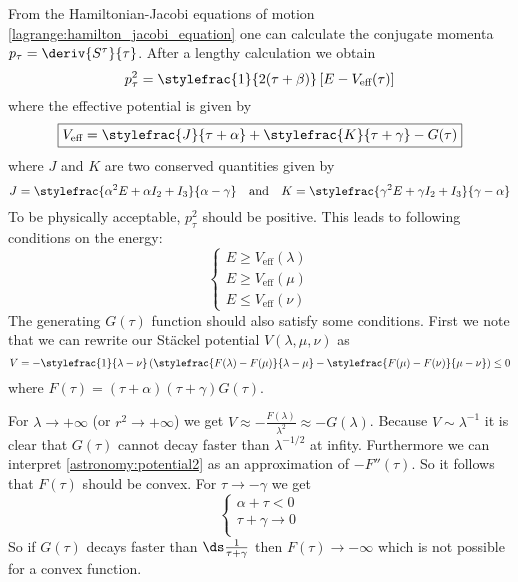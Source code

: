     From the Hamiltonian-Jacobi equations of motion \ref{lagrange:hamilton_jacobi_equation} one can calculate the conjugate momenta $p_\tau = \deriv{S^\tau}{\tau}$. After a lengthy calculation we obtain
    \begin{equation}
    	p_\tau^2 = \stylefrac{1}{2(\tau + \beta)}\left[E - V_{\text{eff}}(\tau)\right]
    \end{equation}
    where the effective potential is given by
    \begin{equation}
    	\boxed{V_{\text{eff}} = \stylefrac{J}{\tau + \alpha} + \stylefrac{K}{\tau + \gamma} - G(\tau)}
    \end{equation}
    where $J$ and $K$ are two conserved quantities given by
    \[J = \stylefrac{\alpha^2E + \alpha I_2 + I_3}{\alpha - \gamma} \quad\text{and}\quad K = \stylefrac{\gamma^2E + \gamma I_2 + I_3}{\gamma - \alpha}\]
    To be physically acceptable, $p_\tau^2$ should be positive. This leads to following conditions on the energy:
    \begin{equation}
    	\begin{cases}
    		E\geq V_{\text{eff}}(\lambda)\\
            E\geq V_{\text{eff}}(\mu)\\
            E\leq V_{\text{eff}}(\nu)
    	\end{cases}
    \end{equation}The generating $G(\tau)$ function should also satisfy some conditions. First we note that we can rewrite our St\"ackel potential $V(\lambda, \mu, \nu)$ as
    \begin{equation}
    	\label{astronomy:potential2}
    	V = -\stylefrac{1}{\lambda - \nu}\left(\stylefrac{F(\lambda) - F(\mu)}{\lambda - \mu} - \stylefrac{F(\mu) - F(\nu)}{\mu - \nu}\right) \leq 0
    \end{equation}
    where $F(\tau) = (\tau + \alpha)(\tau + \gamma)G(\tau)$.
    
     For $\lambda\rightarrow+\infty$ (or $r^2\rightarrow+\infty$) we get $V \approx -\frac{F(\lambda)}{\lambda^2} \approx -G(\lambda)$. Because $V\sim \lambda^{-1}$ it is clear that $G(\tau)$ cannot decay faster than $\lambda^{-1/2}$ at infity. Furthermore we can interpret \ref{astronomy:potential2} as an approximation of $-F''(\tau)$. So it follows that $F(\tau)$ should be convex. For $\tau\rightarrow-\gamma$ we get
    \[\begin{cases}
    	\alpha + \tau < 0\\
        \tau + \gamma \rightarrow 0\\
    \end{cases}\]
    So if $G(\tau)$ decays faster than $\ds\frac{1}{\tau + \gamma}$ then $F(\tau)\rightarrow-\infty$ which is not possible for a convex function.
    
